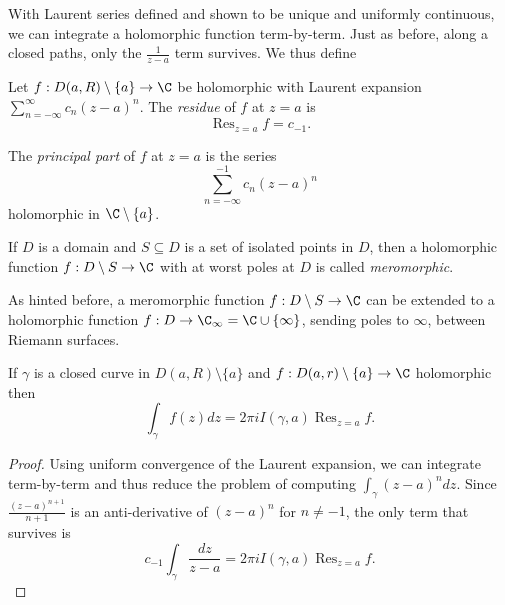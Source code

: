 \documentclass[a4paper]{article}
\DeclareMathOperator*{\res}{Res}
\begin{document}
With Laurent series defined and shown to be unique and uniformly continuous, we can integrate a holomorphic function term-by-term. Just as before, along a closed paths, only the \(\frac{1}{z - a}\) term survives. We thus define

\begin{definition}[Residue]
  Let \(f: D(a, R) \setminus \{a\} \to \C\) be holomorphic with Laurent expansion \(\sum_{n = -\infty}^\infty c_n(z - a)^n\). The \emph{residue} of \(f\) at \(z = a\) is
  \[
    \res_{z = a} f = c_{-1}.
  \]
\end{definition}

\begin{definition}
  The \emph{principal part} of \(f\) at \(z = a\) is the series
  \[
    \sum_{n = -\infty}^{-1} c_n(z - a)^n
  \]
  holomorphic in \(\C \setminus \{a\}\).
\end{definition}

\begin{definition}[Meromorphic]
  If \(D\) is a domain and \(S \subseteq D\) is a set of isolated points in \(D\), then a holomorphic function \(f: D \setminus S \to \C\) with at worst poles at \(D\) is called \emph{meromorphic}.
\end{definition}

\begin{remark}
  As hinted before, a meromorphic function \(f: D \setminus S \to \C\) can be extended to a holomorphic function \(f: D \to \C_\infty = \C \cup \{\infty\}\), sending poles to \(\infty\), between Riemann surfaces.
\end{remark}

\begin{proposition}
  If \(\gamma\) is a closed curve in \(D(a, R) \setminus \{a\}\) and \(f: D(a, r) \setminus \{a\} \to \C\) holomorphic then
  \[
    \int_\gamma f(z) dz = 2\pi i I(\gamma, a) \res_{z = a} f.
  \]
\end{proposition}

\begin{proof}
  Using uniform convergence of the Laurent expansion, we can integrate term-by-term and thus reduce the problem of computing \(\int_\gamma (z - a)^n dz\). Since \(\frac{(z - a)^{n + 1}}{n + 1}\) is an anti-derivative of \((z - a)^n\) for \(n \neq -1\), the only term that survives is
  \[
    c_{-1} \int_\gamma \frac{dz}{z - a} = 2\pi i I(\gamma, a) \res_{z = a} f.
  \]
\end{proof}
\end{document}

